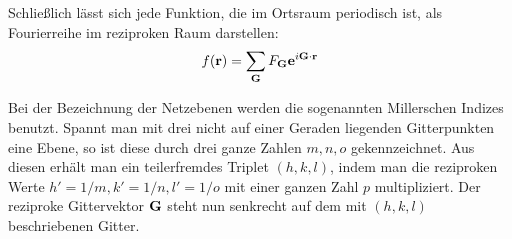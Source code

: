 Schließlich lässt sich jede Funktion, die im Ortsraum periodisch ist, als 
Fourierreihe im reziproken Raum darstellen:
\begin{equation}
    f(\mathbf{r}) = \sum_{\mathbf{G}} F_{\mathbf{G}} \mathbf{e}^{i \mathbf{G} \cdot \mathbf{r}}
\end{equation}

Bei der Bezeichnung der Netzebenen werden die sogenannten Millerschen Indizes benutzt. 
Spannt man mit drei nicht auf einer Geraden liegenden Gitterpunkten eine Ebene, so ist 
diese durch 
drei ganze Zahlen $m, n, o$ gekennzeichnet. Aus diesen erhält man ein teilerfremdes 
Triplet $(h, k, l)$, indem man die reziproken Werte $h' = 1/m, k' = 1/n, l' = 1/o$ mit 
einer ganzen Zahl $p$ multipliziert. Der reziproke 
Gittervektor $\mathbf{G}$ steht nun senkrecht auf dem mit $(h, k, l)$ beschriebenen Gitter.
\cite{ibach2009festkorperphysik}






